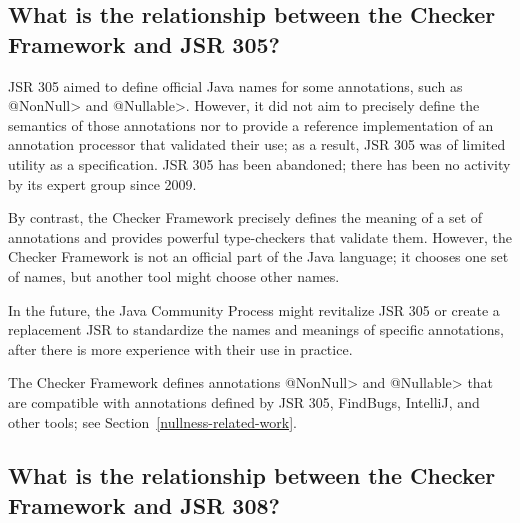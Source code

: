 \subsection{What is the relationship between the Checker Framework and JSR 305?\label{faq-jsr-305}}

JSR 305 aimed to define official Java names for some annotations, such as
\<@NonNull> and \<@Nullable>.  However, it did not aim to precisely define
the semantics of those annotations nor to provide a reference
implementation of an annotation processor that validated their use;
as a result, JSR 305 was of limited utility as a specification.
JSR 305 has been abandoned; there has been
no activity by its expert group since
2009.

By contrast, the Checker Framework precisely defines the meaning of a set
of annotations and provides powerful type-checkers that validate them.
However, the Checker Framework is not an official part of the Java
language; it chooses one set of names, but another tool might choose other
names.

In the future, the Java Community Process might revitalize JSR 305 or
create a replacement JSR to standardize the names and
meanings of specific annotations, after there is more experience with their
use in practice.



The Checker Framework defines annotations \<@NonNull> and \<@Nullable> that
are compatible with annotations defined by JSR 305, FindBugs, IntelliJ, and
other tools; see Section~\ref{nullness-related-work}.


\subsection{What is the relationship between the Checker Framework and JSR 308?\label{faq-jsr-308}}

